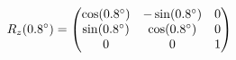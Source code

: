 \documentclass[preview]{standalone}
\begin{document}
\begin{align*}
\special{dvisvgm:raw <g id='unique000'>}R_z(0.8^\circ) = \begin{pmatrix} \cos(0.8^\circ) & -\sin(0.8^\circ) & 0 \\ \sin(0.8^\circ) & \cos(0.8^\circ) & 0 \\ 0 & 0 & 1 \end{pmatrix}\special{dvisvgm:raw </g>}
\end{align*}
\end{document}
